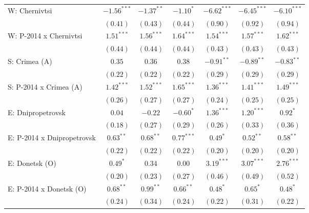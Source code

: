 \begin{table}
\begin{center}
\begin{small}
\begin{tabular}{l c c c c c c}
W: Chernivtsi               & $-1.56^{***}$ & $-1.37^{**}$ & $-1.10^{*}$    & $-6.62^{***}$ & $-6.45^{***}$ & $-6.10^{***}$ \\
                            & $(0.41)$      & $(0.43)$     & $(0.44)$       & $(0.90)$      & $(0.92)$      & $(0.94)$      \\
W: P-2014 x Chernivtsi      & $1.51^{***}$  & $1.56^{***}$ & $1.64^{***}$   & $1.54^{***}$  & $1.57^{***}$  & $1.62^{***}$  \\
                            & $(0.44)$      & $(0.44)$     & $(0.44)$       & $(0.43)$      & $(0.43)$      & $(0.43)$      \\
S: Crimea (A)               & $0.35$        & $0.36$       & $0.38$         & $-0.91^{**}$  & $-0.89^{**}$  & $-0.83^{**}$  \\
                            & $(0.22)$      & $(0.22)$     & $(0.22)$       & $(0.29)$      & $(0.29)$      & $(0.29)$      \\
S: P-2014 x Crimea (A)      & $1.42^{***}$  & $1.52^{***}$ & $1.65^{***}$   & $1.36^{***}$  & $1.41^{***}$  & $1.49^{***}$  \\
                            & $(0.26)$      & $(0.27)$     & $(0.27)$       & $(0.24)$      & $(0.25)$      & $(0.25)$      \\
E: Dnipropetrovsk           & $0.04$        & $-0.22$      & $-0.60^{*}$    & $1.36^{***}$  & $1.20^{***}$  & $0.92^{*}$    \\
                            & $(0.18)$      & $(0.27)$     & $(0.29)$       & $(0.26)$      & $(0.33)$      & $(0.36)$      \\
E: P-2014 x Dnipropetrovsk  & $0.63^{**}$   & $0.68^{**}$  & $0.77^{***}$   & $0.49^{*}$    & $0.52^{**}$   & $0.58^{**}$   \\
                            & $(0.22)$      & $(0.22)$     & $(0.22)$       & $(0.20)$      & $(0.20)$      & $(0.20)$      \\
E: Donetsk (O)              & $0.49^{*}$    & $0.34$       & $0.00$         & $3.19^{***}$  & $3.07^{***}$  & $2.76^{***}$  \\
                            & $(0.20)$      & $(0.23)$     & $(0.27)$       & $(0.46)$      & $(0.49)$      & $(0.52)$      \\
E: P-2014 x Donetsk (O)     & $0.68^{**}$   & $0.99^{**}$  & $0.66^{**}$    & $0.48^{*}$    & $0.65^{*}$    & $0.48^{*}$    \\
                            & $(0.24)$      & $(0.34)$     & $(0.24)$       & $(0.22)$      & $(0.31)$      & $(0.22)$      \\

\end{tabular}
\end{small}
\end{center}
\end{table}
